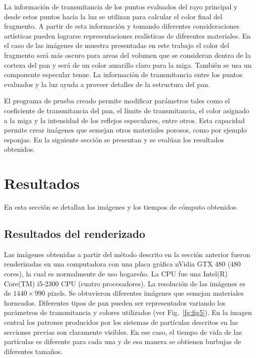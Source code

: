 \documentclass[oneside,a4paper,spanish,links]{amca}
\begin{document}
La información de transmitancia de los puntos evaluados del rayo
principal y desde estos puntos hacia la luz se
utilizan para calcular el color final del fragmento. A partir de
esta información y tomando diferentes consideraciones artísticas
pueden lograrse representaciones realísticas de diferentes
materiales. En el caso de las imágenes de muestra presentadas en este
trabajo el color del fragmento será más oscuro para areas del volumen
que se consideran dentro de la corteza del pan y será de un color
amarillo claro para la miga. También se usa un componente especular
tenue. La información de transmitancia entre los puntos evaluados y la
luz ayuda a proveer detalles de la estructura del pan.

El programa de prueba creado permite modificar parámetros tales como
el coeficiente de transmitancia del pan, el límite de transmitancia,
el color asignado a la miga y la intensidad de los reflejos especulares,
entre otros. Esta capacidad permite crear imágenes que semejan otros
materiales porosos, como por ejemplo esponjas. En la siguiente sección
se presentan y se evalúan los resultados obtenidos.

\section{Resultados}

En esta sección se detallan las imágenes y los tiempos de
cómputo obtenidos. 

\subsection{Resultados del renderizado}

Las imágenes obtenidas a partir del método descrito en la
sección anterior fueron renderizadas en una computadora con una placa
gráfica nVidia GTX 480 ($480$ cores), la cual es normalmente de uso
hogareño. La CPU fue una Intel(R) Core(TM) i5-2300 CPU (cuatro
procesadores). La resolución de las imágenes es de $1440\times990$
pixels. 
Se obtuvieron diferentes imágenes que semejan materiales
horneados. Diferentes tipos de pan pueden ser representados variando los parámetros de transmitancia y colores utilizados (ver
Fig.~\ref{fg:fig5}). En la imagen central los patrones producidos
por los sistemas de partículas descritos en las secciones previas son
claramente visibles. En ese caso, el tiempo de vida de las partículas
es diferente para cada una y de esa manera se obtienen burbujas de
diferentes tamaños.
\end{document}
